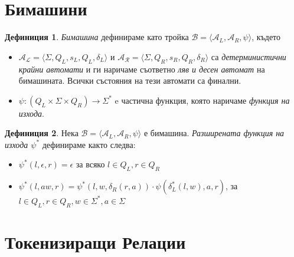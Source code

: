 \documentclass[11pt, oneside]{article}
\theoremstyle{definition}
\newtheorem{definition}{Дефиниция}[section]
\begin{document}
\section{Бимашини}

\begin{definition}
	 \emph{Бимашина} дефинираме като тройка \( \mathcal{B} = \langle \mathcal{A}_L, \mathcal{A}_R, \psi \rangle \), където

	\begin{itemize}
		\item \( \mathcal{A_L} = \langle \Sigma, Q_L, s_L, Q_L, \delta_L \rangle \) и \( \mathcal{A_R} = \langle \Sigma, Q_R, s_R, Q_R, \delta_R \rangle \) са \emph{детерминистични крайни автомати} и ги наричаме съответно \emph{ляв и десен автомат} на бимашината. Всички състояния на тези автомати са финални.
		\item \( \psi:(Q_L \times \Sigma \times Q_R) \to \Sigma^* \) e частична функция, която наричаме \emph{функция на изхода}.
	\end{itemize}
\end{definition}

\begin{definition}
	Нека \( \mathcal{B} = \langle \mathcal{A}_L, \mathcal{A}_R, \psi \rangle \) е бимашина. \emph{Разширената функция на изхода \( \psi^* \)} дефинираме както следва:

	\begin{itemize}
		\item \( \psi^*(l, \epsilon, r) = \epsilon \) за всяко \( l \in Q_L, r \in Q_R \)
		\item \( \psi^*(l, aw, r) = \psi^*(l, w, \delta_R(r, a)) \cdot \psi(\delta^*_L(l, w), a, r) \), за \( l \in Q_L, r \in Q_R, w \in \Sigma^*, a \in \Sigma \)
	\end{itemize}
\end{definition}

\section{Токенизиращи Релации}

\end{document}
